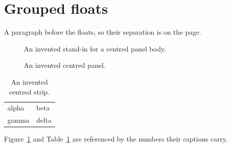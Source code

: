 \documentclass{article}
\begin{document}
\section{Grouped floats}

A paragraph before the floats, so their separation is on the page.

\begin{figure}[h]
\begin{center}
An invented stand-in for a centred panel body.
\caption{An invented centred panel.}
\label{fig:panel}
\end{center}
\end{figure}

\begin{table}[h]
\begin{center}
\begin{tabular}{ll}
alpha & beta \\
gamma & delta \\
\end{tabular}
\caption{An invented centred strip.}
\label{tab:strip}
\end{center}
\end{table}

Figure~\ref{fig:panel} and Table~\ref{tab:strip} are referenced by the
numbers their captions carry.
\end{document}
